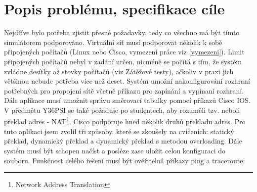 \chapter{Popis problému, specifikace cíle}


Nejdříve bylo potřeba zjistit přesné požadavky, tedy co všechno má být tímto simulátorem podporováno. Virtuální síť musí podporovat několik k sobě připojených počítačů (Linux nebo Cisco, vymezení práce viz \ref{vymezeni}). Limit připojených počítačů nebyl v zadání určen, nicméně se počítá s tím, že systém zvládne desítky až stovky počítačů (viz Zátěžové testy), ačkoliv v praxi jich většinou nebude potřeba více než deset. Systém umožní nakonfigurování rozhraní potřebných pro propojení sítě včetně příkazu pro zapínání a vypínaní rozhraní. Dále aplikace musí umožnit správu směrovací tabulky pomocí příkazů Cisco IOS. V předmětu Y36PSI se také požaduje po studentech, aby rozuměli tzv.  neboli překlad adres - NAT\footnote{Network Address Translation}. Cisco podporuje hned několik druhů překladu adres. Pro tuto aplikaci jsem zvolil tři způsoby, které se zkoušely na cvičeních: statický překlad, dynamický překlad a dynamický překlad s metodou overloading. Dále systém musí být schopen načíst a posléze zase uložit celou konfiguraci do souboru. Funkčnost celého řešení musí být ověřitelná příkazy ping a traceroute.

